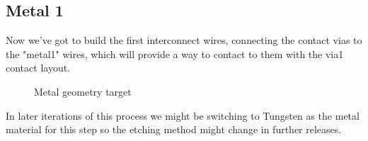\subsection{Metal 1}\label{chapter_metal1}

Now we've got to build the first interconnect wires, connecting the contact vias to the "metal1" wires, which will provide a way to contact to them with the via1 contact layout.

\begin{figure}[H]
	\centering
	\begin{tikzpicture}[node distance = 3cm, auto, thick,scale=\CrossAndTopSectionBig, every node/.style={transform shape}]
		
	\end{tikzpicture}
	\caption{Metal geometry target}
	\label{metal1_target}
\end{figure}

In later iterations of this process we might be switching to Tungsten as the metal material for this step so the etching method might change in further releases.
